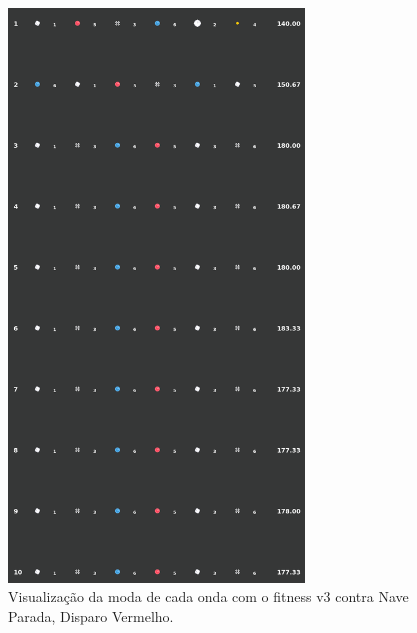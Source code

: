 \begin{figure}[H]
  \centering
  \includegraphics[width=0.7\textwidth]{figuras/ss/ss_redstill_ai_mode_2_1.png}
  \caption{Visualização da moda de cada onda com o fitness v3 contra Nave Parada, Disparo Vermelho.}
  \label{fig:ss-moda-rs-2-1}
\end{figure}

